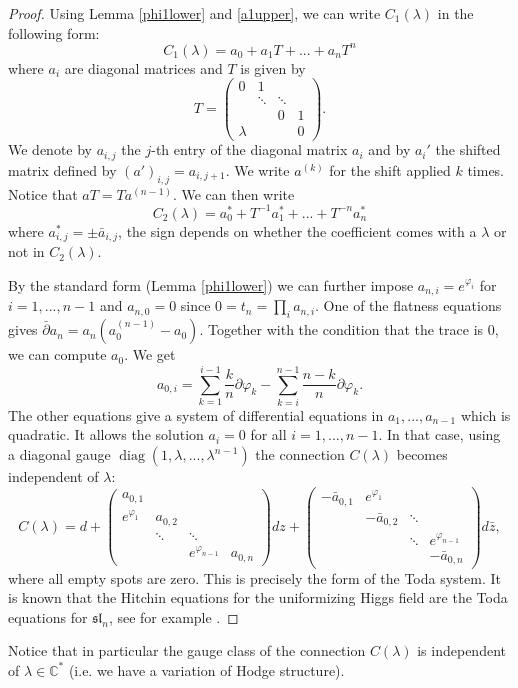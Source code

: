 \documentclass[11pt]{amsart}
\numberwithin{thm}{section} %
\numberwithin{equation}{section} %
\numberwithin{figure}{section} %
\newcommand*{\C}{\mathbb{C}}
\renewcommand*{\l}{\lambda}
\newcommand*{\mf}{\mathfrak}
\newcommand*{\del}{\partial}
\newcommand*{\delbar}{\bar\partial}
\DeclareMathOperator{\diag}{diag}
\begin{document}
\begin{proof}
Using Lemma \ref{phi1lower} and \ref{a1upper}, we can write $C_1(\l)$ in the following form: $$C_1(\l)=a_0+a_1T+...+a_nT^n$$ where $a_i$ are diagonal matrices and $T$ is given by 
\begin{equation}\label{matrixT}
T=\begin{pmatrix} 0& 1 & & \\ &\ddots&\ddots & \\ &&0& 1 \\ \l &&&0 \end{pmatrix}.
\end{equation}
We denote by $a_{i,j}$ the $j$-th entry of the diagonal matrix $a_i$ and by $a_i'$ the shifted matrix defined by $(a')_{i,j} = a_{i,j+1}$. We write $a^{(k)}$ for the shift applied $k$ times. Notice that $aT=Ta^{(n-1)}$. We can then write 
$$C_2(\l)= a_0^*+T^{-1}a_1^*+...+T^{-n}a_n^*$$ where $a^*_{i,j}=\pm \bar{a}_{i,j}$, the sign depends on whether the coefficient comes with a $\l$ or not in $C_2(\l)$.

By the standard form (Lemma \ref{phi1lower}) we can further impose $a_{n,i}=e^{\varphi_i}$ for $i=1,...,n-1$ and $a_{n,0}=0$ since $0=t_n=\prod_i a_{n,i}$. 
One of the flatness equations gives $\delbar a_n = a_n (a_0^{(n-1)}-a_0)$. Together with the condition that the trace is 0, we can compute $a_0$. We get
\begin{equation}\label{a0i}
a_{0,i}= \sum_{k=1}^{i-1}\frac{k}{n}\del\varphi_k-\sum_{k=i}^{n-1}\frac{n-k}{n}\del\varphi_k.
\end{equation}
The other equations give a system of differential equations in $a_1, ..., a_{n-1}$ which is quadratic. It allows the solution $a_i=0$ for all $i=1,...,n-1$. 
In that case, using a diagonal gauge $\diag (1,\lambda, ..., \lambda^{n-1})$ the connection $C(\l)$ becomes independent of $\l$:
\begin{equation}\label{mu0t0}
C(\l)=d+\begin{pmatrix} a_{0,1}&&& \\ e^{\varphi_1} &a_{0,2} && \\ & \ddots &\ddots & \\ && e^{\varphi_{n-1}} & a_{0,n} \end{pmatrix}dz+\begin{pmatrix}-\bar{a}_{0,1} & e^{\varphi_1} && \\ &-\bar{a}_{0,2} & \ddots & \\ &&\ddots & e^{\varphi_{n-1}} \\ &&&-\bar{a}_{0,n} \end{pmatrix}d\bar{z},
\end{equation}
where all empty spots are zero.
This is precisely the form of the Toda system. It is known that the Hitchin equations for the uniformizing Higgs field are the Toda equations for $\mf{sl}_n$, see for example \cite[Proposition 3.1]{AF}.
\end{proof}
Notice that in particular the gauge class of the connection $C(\l)$ is independent of $\l\in \C^*$ (i.e. we have a variation of Hodge structure). 
\end{document}
